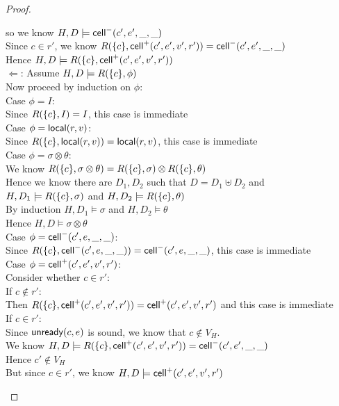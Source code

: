 \begin{proof}
\begin{itemize}
\begin{tabbedproof}
\oooox so we know $H, D \models \mathsf{cell}^{-}({c'}, {e'}, {\_}, {\_})$ \\
\ooooo Since $c \in r'$, we know $R(\{{c}\}, \mathsf{cell}^{+}({c'}, {e'}, {v'}, {r'})) = \mathsf{cell}^{-}({c'}, {e'}, {\_}, {\_})$ \\
\ooooo Hence $H, D \models R(\{{c}\}, \mathsf{cell}^{+}({c'}, {e'}, {v'}, {r'}))$ \\
\oo $\Leftarrow$: Assume $H, D \models R(\{{c}\}, \phi)$ \\
\ooo Now proceed by induction on $\phi$: \\
\ooo Case $\phi = I$: \\
\oooo Since $R(\{{c}\}, I) = I$, this case is immediate \\
\ooo Case $\phi = \mathsf{local}({r}, {v})$: \\
\oooo Since $R(\{{c}\}, \mathsf{local}({r}, {v})) = \mathsf{local}({r}, {v})$, this case is immediate \\
\ooo Case $\phi = \sigma \otimes \theta$: \\
\oooo We know $R(\{{c}\}, \sigma \otimes \theta) = R(\{{c}\}, \sigma) \otimes R(\{{c}\}, \theta)$ \\
\oooo Hence we know there are $D_1, D_2$ such that $D = D_1 \uplus D_2$ and \\
\ooox $H, D_1 \models R(\{{c}\}, \sigma)$ and $H, D_2 \models R(\{{c}\}, \theta)$ \\
\oooo By induction $H, D_1 \models \sigma$ and $H, D_2 \models \theta$ \\
\oooo Hence $H, D \models \sigma \otimes \theta$ \\
\ooo Case $\phi = \mathsf{cell}^{-}({c'}, {e}, {\_}, {\_})$: \\
\oooo Since $R(\{{c}\}, \mathsf{cell}^{-}({c'}, {e}, {\_}, {\_})) = \mathsf{cell}^{-}({c'}, {e}, {\_}, {\_})$, this case is immediate \\
\ooo Case $\phi = \mathsf{cell}^{+}({c'}, {e'}, {v'}, {r'})$: \\
\oooo Consider whether $c \in r'$: \\
\oooo If $c \not\in r'$: \\
\ooooo Then $R(\{{c}\}, \mathsf{cell}^{+}({c'}, {e'}, {v'}, {r'})) = \mathsf{cell}^{+}({c'}, {e'}, {v'}, {r'})$ and this case is immediate \\
\oooo If $c \in r'$: \\
\ooooo Since $\mathsf{unready}({c}, {e})$ is sound, we know that $c \not\in V_H$. \\ 
\ooooo We know $H, D \models R(\{{c}\}, \mathsf{cell}^{+}({c'}, {e'}, {v'}, {r'})) = \mathsf{cell}^{-}({c'}, {e'}, {\_}, {\_})$ \\
\ooooo Hence $c' \not\in V_H$ \\
\ooooo But since $c \in r'$, we know $H, D \models \mathsf{cell}^{+}({c'}, {e'}, {v'}, {r'})$ \\
\end{tabbedproof}




\end{itemize}
\end{proof}
